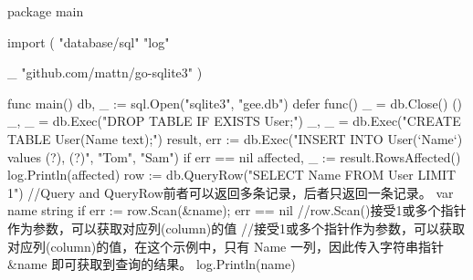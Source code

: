 package main

import (
	"database/sql"
	"log"

	_ "github.com/mattn/go-sqlite3"
)

func main() {
	db, _ := sql.Open("sqlite3", "gee.db")
	defer func() { _ = db.Close() }()
	_, _ = db.Exec("DROP TABLE IF EXISTS User;")
	_, _ = db.Exec("CREATE TABLE User(Name text);")
	result, err := db.Exec("INSERT INTO User(`Name`) values (?), (?)", "Tom", "Sam")
	if err == nil {
		affected, _ := result.RowsAffected()
		log.Println(affected)
	}
	row := db.QueryRow("SELECT Name FROM User LIMIT 1") //Query and QueryRow前者可以返回多条记录，后者只返回一条记录。
	var name string
	if err := row.Scan(&name); err == nil { //row.Scan()接受1或多个指针作为参数，可以获取对应列(column)的值
		//接受1或多个指针作为参数，可以获取对应列(column)的值，在这个示例中，只有 Name 一列，因此传入字符串指针 &name 即可获取到查询的结果。
		log.Println(name)
	}
}
